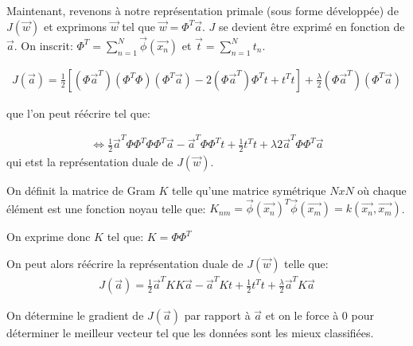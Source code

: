 Maintenant, revenons à notre représentation primale (sous forme développée) de $J(\overrightarrow{w})$ et exprimons $\overrightarrow{w}$ tel que $\overrightarrow{w} = \Phi^T \overrightarrow{a}$. 
$J$ se devient être exprimé en fonction de $\overrightarrow{a}$. On inscrit: $\Phi^T = \sum_{n=1}^N \overrightarrow{\phi}(\overrightarrow{x_n}) $ et $\overrightarrow{t} = \sum_{n=1}^Nt_n$.

\begin{equation}
\begin{split}
	J(\overrightarrow{a}) = \frac{1}{2} \left[(\Phi \overrightarrow{a}^T)(\Phi^T \Phi)(\Phi^T \overrightarrow{a}) - 2 (\Phi \overrightarrow{a}^T)\Phi^T t + t^T t \right] + \frac{\lambda}{2} (\Phi \overrightarrow{a}^T) (\Phi^T \overrightarrow{a})
\end{split}
\end{equation}

que l'on peut réécrire tel que:

\begin{equation}
\begin{split}
	\iff \frac{1}{2} \overrightarrow{a}^T \Phi \Phi^T \Phi \Phi^T \overrightarrow{a} - \overrightarrow{a}^T \Phi \Phi^T  t + \frac{1}{2} t^T t + {\lambda}{2} \overrightarrow{a}^T \Phi \Phi^T \overrightarrow{a}
\end{split}
\end{equation}
qui etst la représentation duale de $J(\overrightarrow{w})$.

On définit la matrice de Gram $K$ telle qu'une matrice symétrique $NxN$ où chaque élément est une fonction noyau telle que: $ K_{nm} = \overrightarrow{\phi} (\overrightarrow{x_n})^T \overrightarrow{\phi} (\overrightarrow{x_m}) = k(\overrightarrow{x_n}, \overrightarrow{x_m})$.

On exprime donc $K$ tel que: $K = \Phi \Phi^T$

On peut alors réécrire la représentation duale de $J(\overrightarrow{w})$ telle que:
\begin{equation}
\begin{split}
	J(\overrightarrow{a}) = \frac{1}{2} \overrightarrow{a}^T K K \overrightarrow{a} - \overrightarrow{a}^T K t + \frac{1}{2} t^T t + \frac{\lambda}{2} \overrightarrow{a}^T K \overrightarrow{a}
\end{split}
\end{equation}

On détermine le gradient de $J(\overrightarrow{a})$ par rapport à $\overrightarrow{a}$ et on le force à 0 pour déterminer le meilleur vecteur tel que les données sont les mieux classifiées.

